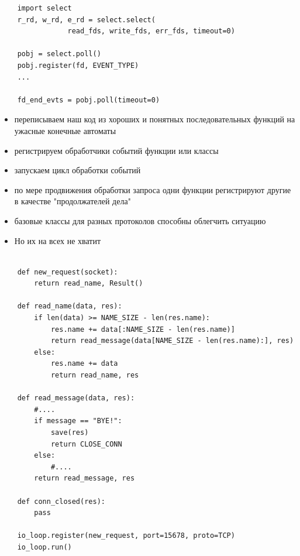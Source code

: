 \documentclass{article}
\begin{document}
\newpage
{
\LARGE \vspace{15pt}
\begin{lstlisting}
	import select
	r_rd, w_rd, e_rd = select.select(
				read_fds, write_fds, err_fds, timeout=0)

	pobj = select.poll()
	pobj.register(fd, EVENT_TYPE)
	...

	fd_end_evts = pobj.poll(timeout=0)
\end{lstlisting}
}
\newpage
\begin{itemize}
	\item переписываем наш код из хороших и понятных последовательных 
			функций на ужасные конечные автоматы
	\item регистрируем обработчики событий функции или классы
	\item запускаем цикл обработки событий
	\item по мере продвижения обработки запроса одни функции регистрируют другие в качестве "продолжателей дела"
	\item базовые классы для разных протоколов способны облегчить ситуацию
	\item Но их на всех не хватит
\end{itemize}
\newpage
{
\Large \vspace{15pt}
\begin{lstlisting}

	def new_request(socket):
		return read_name, Result()

	def read_name(data, res):
		if len(data) >= NAME_SIZE - len(res.name):
			res.name += data[:NAME_SIZE - len(res.name)]
			return read_message(data[NAME_SIZE - len(res.name):], res)
		else:
			res.name += data
			return read_name, res

	def read_message(data, res):
		#....
		if message == "BYE!":
			save(res)
			return CLOSE_CONN
		else:
			#....
		return read_message, res

	def conn_closed(res):
		pass

	io_loop.register(new_request, port=15678, proto=TCP)
	io_loop.run()

\end{lstlisting}
}
\newpage
\end{document}
